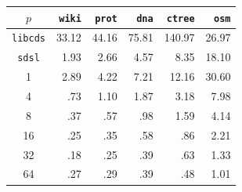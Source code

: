   {\noindent
  \begin{minipage}{\textwidth}
  \begin{minipage}[b]{0.48\textwidth}
      \begin{tabular}{c|rrrrr}
       $p$ & {\tt wiki} & {\tt prot} & {\tt dna} & {\tt ctree} & {\tt osm}\\
        \hline
        \hline
        {\tt libcds} & 33.12 & 44.16 & 75.81 & 140.97 & 26.97 \\
        {\tt sdsl} & 1.93 & 2.66 & 4.57 & 8.35 & 18.10 \\
        \hline
        1 & 2.89 & 4.22 & 7.21 & 12.16 & 30.60 \\
        4 &  .73 & 1.10 & 1.87 & 3.18 & 7.98 \\
        8 &  .37 &  .57 &  .98 & 1.59 & 4.14 \\
        16 &  .25 &  .35 &  .58 &  .86 & 2.21 \\
        32 &  .18 &  .25 &  .39 &  .63 & 1.33 \\
        64 &  .27 &  .29 &  .39 &  .48 & 1.01 \\
         \hline
      \end{tabular}
      \label{tbl:parallelTimes}
    \end{minipage}
    \begin{minipage}[b]{0.51\textwidth}

\end{minipage}
\end{minipage}}
